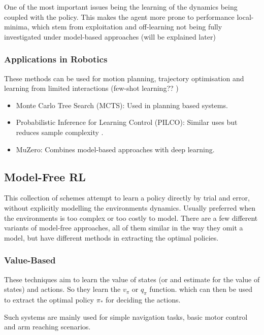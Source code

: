   One of the most important issues being the learning of the dynamics being coupled with the policy. This makes the agent more prone to performance local-minima, which stem from exploitation and off-learning not being fully investigated under model-based approaches (will be explained later) 

  \subsubsection{Applications in Robotics}
  These methods can be used for motion planning, trajectory optimisation and learning from limited interactions (few-shot learning?? )
    \begin{itemize}
      \item Monte Carlo Tree Search (MCTS): Used in planning based systems.
      \item Probabilistic Inference for Learning Control (PILCO): Similar uses but reduces sample complexity \cite{Deisenroth2011PILCO}.
      \item MuZero: Combines model-based approaches with deep learning. 
    \end{itemize}
  
  
  \subsection{Model-Free RL}
  This collection of schemes attempt to learn a policy directly by trial and error, without explicitly modelling the environments dynamics. Usually preferred when the environments is too complex or too costly to model.
  There are a few different variants of model-free approaches, all of them similar in the way they omit a model, but have different methods in extracting the optimal policies.
  

  \subsubsection{Value-Based}
    These techniques aim to learn the value of states (or and estimate for the value of states) and actions. So they learn the $v_\pi$ or $q_\pi$ function. which can then be used to extract the optimal policy $\pi_*$ for deciding the actions.

    Such systems are mainly used for simple navigation tasks, basic motor control and arm reaching scenarios.

